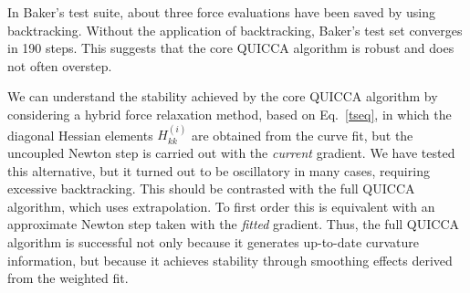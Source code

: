 \documentclass[prl,aps,preprint,superbib,12pt]{revtex4}
\begin{document}
In  Baker's test suite, about three force evaluations have been saved by 
using backtracking. Without the application of backtracking, Baker's test set
converges in 190 steps.  This suggests that the core QUICCA algorithm is robust and
does not often overstep.  

We can understand the stability achieved by the core QUICCA
algorithm by considering a hybrid force relaxation method, based on Eq.~\ref{tseq},
in which the diagonal Hessian elements $H^{(i)}_{kk}$ are obtained from the 
curve fit, but the uncoupled Newton step is carried out with the {\em current} 
gradient.  We have tested this alternative, but it turned out to be oscillatory 
in many cases, requiring excessive backtracking.  This should be contrasted with the
full QUICCA algorithm, which uses extrapolation. To first order this is equivalent with 
an approximate Newton step taken with the {\em fitted} gradient.   Thus, the full 
QUICCA algorithm is successful not only because it generates up-to-date curvature information, 
but because it achieves stability through smoothing effects derived from the weighted fit.
\end{document}
